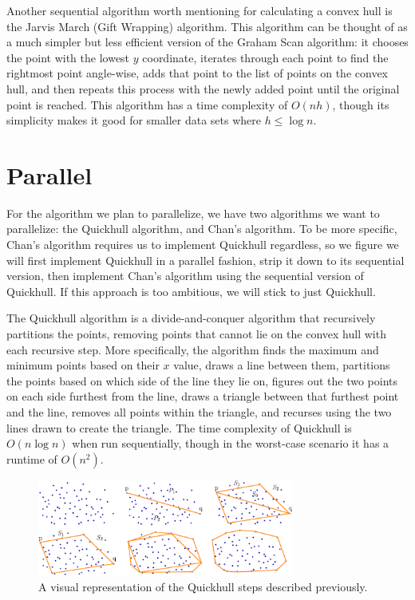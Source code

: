 \documentclass[12pt]{article}
\begin{document}
Another sequential algorithm worth mentioning for calculating a convex hull is the Jarvis March (Gift Wrapping) algorithm. This algorithm can be thought of as a much simpler but less efficient version of the Graham Scan algorithm: it chooses the point with the lowest $y$ coordinate, iterates through each point to find the rightmost point angle-wise, adds that point to the list of points on the convex hull, and then repeats this process with the newly added point until the original point is reached. This algorithm has a time complexity of $O(nh)$, though its simplicity makes it good for smaller data sets where $h\leq\log n$.


\section{Parallel}


For the algorithm we plan to parallelize, we have two algorithms we want to parallelize: the Quickhull algorithm, and Chan’s algorithm. To be more specific, Chan’s algorithm requires us to implement Quickhull regardless, so we figure we will first implement Quickhull in a parallel fashion, strip it down to its sequential version, then implement Chan’s algorithm using the sequential version of Quickhull. If this approach is too ambitious, we will stick to just Quickhull.

The Quickhull algorithm is a divide-and-conquer algorithm that recursively partitions the points, removing points that cannot lie on the convex hull with each recursive step. More specifically, the algorithm finds the maximum and minimum points based on their $x$ value, draws a line between them, partitions the points based on which side of the line they lie on, figures out the two points on each side furthest from the line, draws a triangle between that furthest point and the line, removes all points within the triangle, and recurses using the two lines drawn to create the triangle. The time complexity of Quickhull is $O(n \log n)$ when run sequentially, though in the worst-case scenario it has a runtime of $O(n^2)$.

\begin{figure}[h]
	\centering
	\includegraphics[width=0.75\textwidth]{quickhull.png}
	\caption{A visual representation of the Quickhull steps described previously.}
\end{figure}
\end{document}
